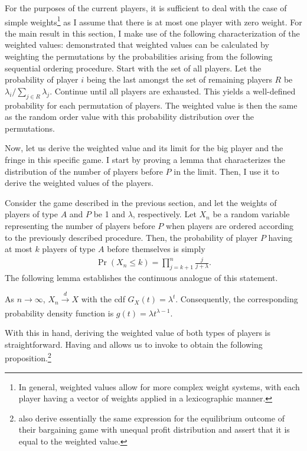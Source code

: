 For the purposes of the current players, it is sufficient to deal with the case of simple weights\footnote{
    In general, weighted values allow for more complex weight systems, with each player having a vector of weights applied in a lexicographic manner.
}
as I assume that there is at most one player with zero weight.
For the main result in this section, I make use of the following characterization of the weighted values: \textcite{kalai1987weighted} demonstrated that weighted values can be calculated by weighting the permutations by the probabilities arising from the following sequential ordering procedure.
Start with the set of all players.
Let the probability of player $i$ being the last amongst the set of remaining players $R$ be $\lambda_i / \sum_{j \in R} \lambda_j$.
Continue until all players are exhausted.
This yields a well-defined probability for each permutation of players.
The weighted value is then the same as the random order value with this probability distribution over the permutations.

Now, let us derive the weighted value and its limit for the big player and the fringe in this specific game.
I start by proving a lemma that characterizes the distribution of the number of players before $P$ in the limit.
Then, I use it to derive the weighted values of the players.

Consider the game described in the previous section, and let the weights of players of type $A$ and $P$ be 1 and $\lambda$, respectively.
Let $X_n$ be a random variable representing the number of players before $P$ when players are ordered according to the previously described procedure.
Then, the probability of player $P$ having at most $k$ players of type $A$ before themselves is simply
\begin{align}
    \label{eq:entry_distr_discrete}
    \Pr(X_n \leq k) = \prod_{j=k+1}^n \frac{j}{j + \lambda}.
\end{align}
The following lemma establishes the continuous analogue of this statement.
\begin{lemma}
    \label{lem:entry_distr}
    As $n \to \infty$, $X_n \xrightarrow[]{d} X$ with the cdf $G_X(t) = \lambda^t$.
    Consequently, the corresponding probability density function is $g(t) = \lambda t^{\lambda - 1}$.
\end{lemma}

With this in hand, deriving the weighted value of both types of players is straightforward.
Having  and  allows us to invoke  to obtain the following proposition.\footnote{
    \textcite{stole1996intra} also derive essentially the same expression for the equilibrium outcome of their bargaining game with unequal profit distribution and assert that it is equal to the weighted value.
}

